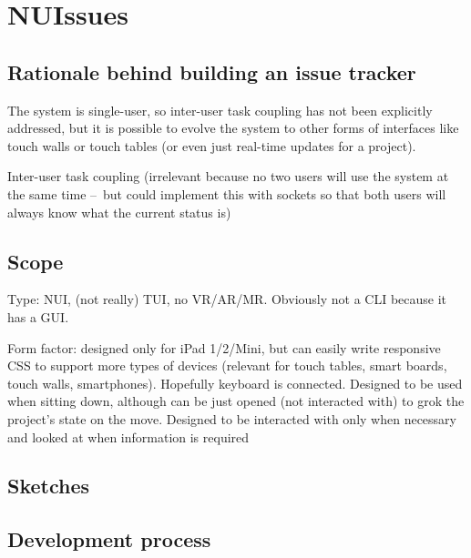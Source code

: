 \section{NUIssues}

\subsection{Rationale behind building an issue tracker}

The system is single-user, so inter-user task coupling has not been explicitly addressed, but it is possible to evolve the system to other forms of interfaces like touch walls or touch tables (or even just real-time updates for a project).

Inter-user task coupling (irrelevant because no two users will use the system at the same time – but could implement this with sockets so that both users will always know what the current status is)

\subsection{Scope}

Type: NUI, (not really) TUI, no VR/AR/MR. Obviously not a CLI because it has a GUI.

Form factor: designed only for iPad 1/2/Mini, but can easily write responsive CSS to support more types of devices (relevant for touch tables, smart boards, touch walls, smartphones). Hopefully keyboard is connected. Designed to be used when sitting down, although can be just opened (not interacted with) to grok the project's state on the move. Designed to be interacted with only when necessary and looked at when information is required

\subsection{Sketches}


\subsection{Development process}

